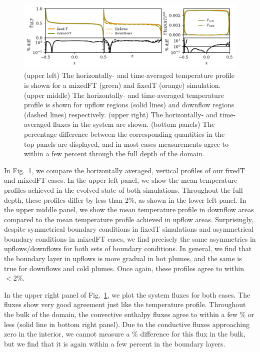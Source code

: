 \documentclass[aps, pre, onecolumn, nofootinbib, notitlepage, groupedaddress, amsfonts, amssymb, amsmath, longbibliography]{revtex4-1}
\begin{document}
\begin{figure}
\includegraphics[width=\textwidth]{./figs/rbc_1D_profiles.pdf}
\caption{ 
	(upper left) The horizontally- and time-averaged temperature profile is shown for a mixedFT (green) and fixedT (orange) simulation.
	(upper middle) The horizontally- and time-averaged temperature profile is shown for upflow regions (solid lines) and downflow regions (dashed lines) respectively.
	(upper right) The horizontally- and time-averaged fluxes in the system are shown.
	(bottom panels) The percentage difference between the corresponding quantities in the top panels are displayed, and in most cases measurements agree to within a few percent through the full depth of the domain.
\label{fig:rbc_1D_profiles} }
\end{figure}

In Fig.~\ref{fig:rbc_1D_profiles}, we compare the horizontally averaged, vertical profiles of our fixedT and mixedFT cases.
In the upper left panel, we show the mean temperature profiles achieved in the evolved state of both simulations.
Throughout the full depth, these profiles differ by less than 2\%, as shown in the lower left panel.
In the upper middle panel, we show the mean temperature profile in downflow areas compared to the mean temperature profile achieved in upflow areas.
Surprisingly, despite symmetrical boundary conditions in fixedT simulations and asymmetrical boundary conditions in mixedFT cases, we find precisely the same asymmetries in upflows/downflows for both sets of boundary conditions.
In general, we find that the boundary layer in upflows is more gradual in hot plumes, and the same is true for downflows and cold plumes.
Once again, these profiles agree to within $< 2\%$.

In the upper right panel of Fig.~\ref{fig:rbc_1D_profiles}, we plot the system fluxes for both cases.
The fluxes show very good agreement just like the temperature profile.
Throughout the bulk of the domain, the convective enthalpy fluxes agree to within a few \% or less (solid line in bottom right panel).
Due to the conductive fluxes approaching zero in the interior, we cannot measure a \% difference for this flux in the bulk, but we find that it is again within a few percent in the boundary layers.
\end{document}
